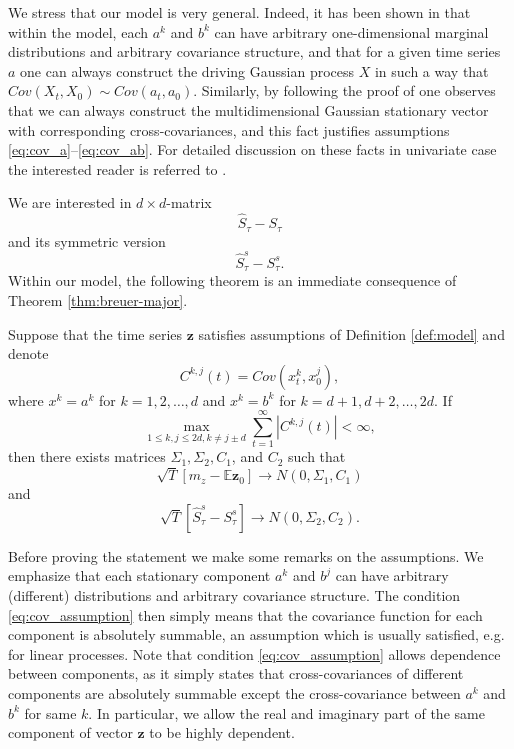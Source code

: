 \documentclass[11pt,a4paper,leqno]{amsart}
\newcommand{\1}{\mathbbm{1}}
\newcommand{\E}{\mathbb{E}}
\newcommand{\0}{\mathbf{0}}
\newcommand{\vz}{\mathbf{z}}
\begin{document}
We stress that our model is very general. Indeed, it has been shown in \cite{ilm-vii} that within the model, each $a^k$ and $b^k$ can have arbitrary one-dimensional marginal distributions and arbitrary covariance structure, and that for a given time series $a$ one can always construct the driving Gaussian process $X$ in such a way that $Cov(X_t,X_0) \sim Cov(a_t,a_0)$. Similarly, by following the proof of \cite[Lemma (REF)]{ilm-vii} one observes that we can always construct the multidimensional Gaussian stationary vector with corresponding cross-covariances, and this fact justifies assumptions \eqref{eq:cov_a}--\eqref{eq:cov_ab}. For detailed discussion on these facts in univariate case the interested reader is referred to \cite{ilm-vii}.


We are interested in $d\times d$-matrix
$$
\hat{S}_\tau - S_\tau
$$
and its symmetric version
$$
\hat{S}_\tau^s - S^s_\tau.
$$
Within our model, the following theorem is an immediate consequence of Theorem \ref{thm:breuer-major}.
\begin{thm}
Suppose that the time series $\vz$ satisfies assumptions of Definition \ref{def:model} and denote
$$
C^{k,j}(t) = Cov(x^k_t,x^j_0),
$$
where $x^k=a^k$ for $k=1,2,\ldots,d$ and $x^k=b^k$ for $k=d+1,d+2,\ldots,2d$. If 
\begin{equation}
\label{eq:cov_assumption}
\max_{1\leq k,j\leq 2d, k\neq j\pm d} \sum_{t=1}^\infty |C^{k,j}(t)| < \infty,
\end{equation}
then there exists matrices $\Sigma_1,\Sigma_2,C_1$, and $C_2$ such that 
\begin{equation}
\label{eq:mean_conv}
\sqrt{T} \left[m_z-\E \vz_0\right] \rightarrow N(0,\Sigma_1,C_1)
\end{equation}
and
\begin{equation}
\label{eq:cov_conv}
\sqrt{T}\left[\hat{S}^s_\tau - S^s_\tau\right] \rightarrow N(0,\Sigma_2,C_2).
\end{equation}
\end{thm}
Before proving the statement we make some remarks on the assumptions. We emphasize that each stationary component $a^k$ and $b^j$ can have arbitrary (different) distributions and arbitrary covariance structure. The condition \eqref{eq:cov_assumption} then simply means that the covariance function for each component is absolutely summable, an assumption which is usually satisfied, e.g. for linear processes. Note that condition \eqref{eq:cov_assumption} allows dependence between components, as it simply states that cross-covariances of different components are absolutely summable except the cross-covariance between $a^k$ and $b^k$ for same $k$. In particular, we allow the real and imaginary part of the same component of vector $\vz$ to be highly dependent.
\end{document}
